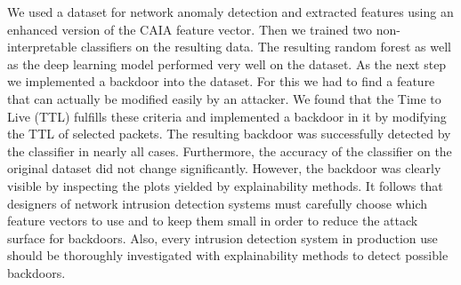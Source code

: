 \documentclass[10pt,sigconf,letterpaper]{acmart}
\begin{document}
We used a dataset for network anomaly detection and extracted features using an enhanced version of the CAIA feature vector. Then we trained two non-interpretable classifiers on the resulting data. The resulting random forest as well as the deep learning model performed very well on the dataset. As the next step we implemented a backdoor into the dataset. For this we had to find a feature that can actually be modified easily by an attacker. We found that the Time to Live (TTL) fulfills these criteria and implemented a backdoor in it by modifying the TTL of selected packets. The resulting backdoor was successfully detected by the classifier in nearly all cases. Furthermore, the accuracy of the classifier on the original dataset did not change significantly. However, the backdoor was clearly visible by inspecting the plots yielded by explainability methods. It follows that designers of network intrusion detection systems must carefully choose which feature vectors to use and to keep them small in order to reduce the attack surface for backdoors. Also, every intrusion detection system in production use should be thoroughly investigated with explainability methods to detect possible backdoors. 



\end{document}
